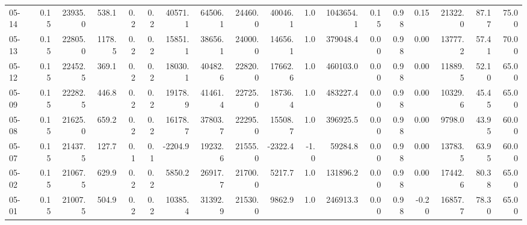 \begin{threeparttable}
{\begin{tabular}{lrrrrrrrrrrrrrrrrr}
  05-14 &     0.15 & 23935.0 &             538.1 &               0.2 &                0.2 &            40571.1 & 64506.1 & 24460.0 &    40046.1 &                      1.0 &           1043654.1 &       0.15 &      0.98 &           0.15 &          21322.0 &           87.17 &                  75.00 \\
  05-13 &     0.15 & 22805.0 &            1178.5 &               0.2 &                0.2 &            15851.1 & 38656.1 & 24000.0 &    14656.1 &                      1.0 &            379048.4 &       0.00 &      0.98 &           0.00 &          13777.2 &           57.41 &                  70.00 \\
  05-12 &     0.15 & 22452.5 &             369.1 &               0.2 &                0.2 &            18030.1 & 40482.6 & 22820.0 &    17662.6 &                      1.0 &            460103.0 &       0.00 &      0.98 &           0.00 &          11889.5 &           52.10 &                  65.00 \\
  05-09 &     0.15 & 22282.5 &             446.8 &               0.2 &                0.2 &            19178.9 & 41461.4 & 22725.0 &    18736.4 &                      1.0 &            483227.4 &       0.00 &      0.98 &           0.00 &          10329.6 &           45.45 &                  65.00 \\
  05-08 &     0.15 & 21625.0 &             659.2 &               0.2 &                0.2 &            16178.7 & 37803.7 & 22295.0 &    15508.7 &                      1.0 &            396925.5 &       0.00 &      0.98 &           0.00 &           9798.0 &           43.95 &                  60.00 \\
  05-07 &     0.15 & 21437.5 &             127.7 &               0.1 &                0.1 &            -2204.9 & 19232.6 & 21555.0 &    -2322.4 &                     -1.0 &             59284.8 &       0.00 &      0.98 &           0.00 &          13783.5 &           63.95 &                  60.00 \\
  05-02 &     0.15 & 21067.5 &             629.9 &               0.2 &                0.2 &             5850.2 & 26917.7 & 21700.0 &     5217.7 &                      1.0 &            131896.2 &       0.00 &      0.98 &           0.00 &          17442.6 &           80.38 &                  65.00 \\
  05-01 &     0.15 & 21007.5 &             504.9 &               0.2 &                0.2 &            10385.4 & 31392.9 & 21530.0 &     9862.9 &                      1.0 &            246913.3 &       0.00 &      0.98 &          -0.20 &          16857.7 &           78.30 &                  65.00 \\

\end{tabular}}
\end{threeparttable}
